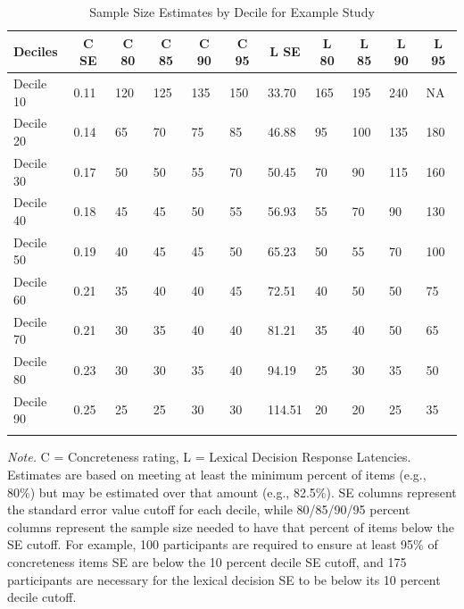 \documentclass[
  man]{apa7}
\begin{document}
\begin{table}[tbp]

\begin{center}
\begin{threeparttable}

\caption{\label{tab:table-example}Sample Size Estimates by Decile for Example Study}

\begin{tabular}{lllllllllll}
\toprule
Deciles & \multicolumn{1}{c}{C SE} & \multicolumn{1}{c}{C 80} & \multicolumn{1}{c}{C 85} & \multicolumn{1}{c}{C 90} & \multicolumn{1}{c}{C 95} & \multicolumn{1}{c}{L SE} & \multicolumn{1}{c}{L 80} & \multicolumn{1}{c}{L 85} & \multicolumn{1}{c}{L 90} & \multicolumn{1}{c}{L 95}\\
\midrule
Decile 10 & 0.11 & 120 & 125 & 135 & 150 & 33.70 & 165 & 195 & 240 & NA\\
Decile 20 & 0.14 & 65 & 70 & 75 & 85 & 46.88 & 95 & 100 & 135 & 180\\
Decile 30 & 0.17 & 50 & 50 & 55 & 70 & 50.45 & 70 & 90 & 115 & 160\\
Decile 40 & 0.18 & 45 & 45 & 50 & 55 & 56.93 & 55 & 70 & 90 & 130\\
Decile 50 & 0.19 & 40 & 45 & 45 & 50 & 65.23 & 50 & 55 & 70 & 100\\
Decile 60 & 0.21 & 35 & 40 & 40 & 45 & 72.51 & 40 & 50 & 50 & 75\\
Decile 70 & 0.21 & 30 & 35 & 40 & 40 & 81.21 & 35 & 40 & 50 & 65\\
Decile 80 & 0.23 & 30 & 30 & 35 & 40 & 94.19 & 25 & 30 & 35 & 50\\
Decile 90 & 0.25 & 25 & 25 & 30 & 30 & 114.51 & 20 & 20 & 25 & 35\\
\bottomrule
\addlinespace
\end{tabular}

\begin{tablenotes}[para]
\normalsize{\textit{Note.} C = Concreteness rating, L = Lexical Decision Response Latencies. Estimates are based on meeting at least the minimum percent of items (e.g., 80\%) but may be estimated over that amount (e.g., 82.5\%). SE columns represent the standard error value cutoff for each decile, while 80/85/90/95 percent columns represent the sample size needed to have that percent of items below the SE cutoff. For example, 100 participants are required to ensure at least 95\% of concreteness items SE are below the 10 percent decile SE cutoff, and 175 participants are necessary for the lexical decision SE to be below its 10 percent decile cutoff.}
\end{tablenotes}

\end{threeparttable}
\end{center}

\end{table}
\end{document}
